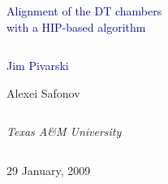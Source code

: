 \documentclass[compress]{beamer}
\begin{document}
\begin{frame}
\vfill
\begin{center}
\textcolor{darkblue}{\Large Alignment of the DT chambers \\ \vspace{0.2 cm} with a HIP-based algorithm}

\vfill
\begin{columns}
\begin{center}
\large
\textcolor{darkblue}{Jim Pivarski}

\vspace{0.2 cm}
Alexei Safonov
\end{center}
\end{columns}

\begin{columns}
\begin{center}
\scriptsize
{\it Texas A\&M University}
\end{center}
\end{columns}

\vfill
29 January, 2009

\end{center}
\end{frame}


\small
\end{document}
